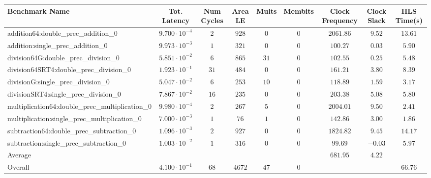 \begin{tabular}{|l|c|c|c|c|c|c|c|c|}
\hline
Benchmark Name                                   & Tot. Latency            & Num Cycles & Area LE  & Mults  & Membits & Clock Frequency & Clock Slack & HLS Time(s) \\
\hline
addition64:double\_prec\_addition\_0             & $ 9.700 \cdot 10^{-4} $ & $ 2      $ & $ 928  $ & $ 0  $ & $ 0   $ & $ 2061.86     $ & $ 9.52    $ & $ 13.61   $ \\
addition:single\_prec\_addition\_0               & $ 9.973 \cdot 10^{-3} $ & $ 1      $ & $ 321  $ & $ 0  $ & $ 0   $ & $ 100.27      $ & $ 0.03    $ & $ 5.90    $ \\
division64G:double\_prec\_division\_0            & $ 5.851 \cdot 10^{-2} $ & $ 6      $ & $ 865  $ & $ 31 $ & $ 0   $ & $ 102.55      $ & $ 0.25    $ & $ 5.48    $ \\
division64SRT4:double\_prec\_division\_0         & $ 1.923 \cdot 10^{-1} $ & $ 31     $ & $ 484  $ & $ 0  $ & $ 0   $ & $ 161.21      $ & $ 3.80    $ & $ 8.39    $ \\
divisionG:single\_prec\_division\_0              & $ 5.047 \cdot 10^{-2} $ & $ 6      $ & $ 253  $ & $ 10 $ & $ 0   $ & $ 118.89      $ & $ 1.59    $ & $ 3.17    $ \\
divisionSRT4:single\_prec\_division\_0           & $ 7.867 \cdot 10^{-2} $ & $ 16     $ & $ 235  $ & $ 0  $ & $ 0   $ & $ 203.38      $ & $ 5.08    $ & $ 5.80    $ \\
multiplication64:double\_prec\_multiplication\_0 & $ 9.980 \cdot 10^{-4} $ & $ 2      $ & $ 267  $ & $ 5  $ & $ 0   $ & $ 2004.01     $ & $ 9.50    $ & $ 2.41    $ \\
multiplication:single\_prec\_multiplication\_0   & $ 7.000 \cdot 10^{-3} $ & $ 1      $ & $ 76   $ & $ 1  $ & $ 0   $ & $ 142.86      $ & $ 3.00    $ & $ 1.86    $ \\
subtraction64:double\_prec\_subtraction\_0       & $ 1.096 \cdot 10^{-3} $ & $ 2      $ & $ 927  $ & $ 0  $ & $ 0   $ & $ 1824.82     $ & $ 9.45    $ & $ 14.17   $ \\
subtraction:single\_prec\_subtraction\_0         & $ 1.003 \cdot 10^{-2} $ & $ 1      $ & $ 316  $ & $ 0  $ & $ 0   $ & $ 99.69       $ & $ -0.03   $ & $ 5.97    $ \\
\hline
Average                                          & $                     $ & $        $ & $      $ & $    $ & $     $ & $ 681.95      $ & $ 4.22    $ & $         $ \\
\hline
Overall                                          & $ 4.100 \cdot 10^{-1} $ & $ 68     $ & $ 4672 $ & $ 47 $ & $ 0   $ & $             $ & $         $ & $ 66.76   $ \\
\hline
\end{tabular}
